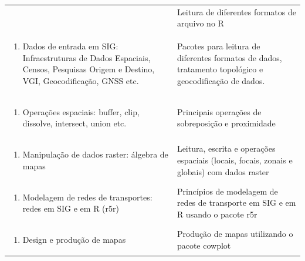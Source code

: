 \documentclass[
  letterpaper,
  DIV=11,
  numbers=noendperiod]{scrreprt}
\providecommand{\tightlist}{%
  \setlength{\itemsep}{0pt}\setlength{\parskip}{0pt}}
\begin{document}
\begin{longtable}[]{@{}
  >{\raggedright\arraybackslash}p{}
  >{\raggedright\arraybackslash}p{}@{}}
\begin{minipage}[t]{\linewidth}
\begin{enumerate}
\end{enumerate}
\end{minipage} & Leitura de diferentes formatos de arquivo no R \\
\begin{minipage}[t]{\linewidth}\raggedright
\begin{enumerate}
\def\labelenumi{\arabic{enumi}.}
\setcounter{enumi}{3}
\tightlist
\item
  Dados de entrada em SIG: Infraestruturas de Dados Espaciais, Censos,
  Pesquisas Origem e Destino, VGI, Geocodificação, GNSS etc.
\end{enumerate}
\end{minipage} & Pacotes para leitura de diferentes formatos de dados,
tratamento topológico e geocodificação de dados. \\
\begin{minipage}[t]{\linewidth}\raggedright
\begin{enumerate}
\def\labelenumi{\arabic{enumi}.}
\setcounter{enumi}{4}
\tightlist
\item
  Operações espaciais: buffer, clip, dissolve, intersect, union etc.
\end{enumerate}
\end{minipage} & Principais operações de sobreposição e proximidade \\
\begin{minipage}[t]{\linewidth}\raggedright
\begin{enumerate}
\def\labelenumi{\arabic{enumi}.}
\setcounter{enumi}{5}
\tightlist
\item
  Manipulação de dados raster: álgebra de mapas
\end{enumerate}
\end{minipage} & Leitura, escrita e operações espaciais (locais, focais,
zonais e globais) com dados raster \\
\begin{minipage}[t]{\linewidth}\raggedright
\begin{enumerate}
\def\labelenumi{\arabic{enumi}.}
\setcounter{enumi}{6}
\tightlist
\item
  Modelagem de redes de transportes: redes em SIG e em R (r5r)
\end{enumerate}
\end{minipage} & Princípios de modelagem de redes de transporte em SIG e
em R usando o pacote r5r \\
\begin{minipage}[t]{\linewidth}\raggedright
\begin{enumerate}
\def\labelenumi{\arabic{enumi}.}
\setcounter{enumi}{7}
\tightlist
\item
  Design e produção de mapas
\end{enumerate}
\end{minipage} & Produção de mapas utilizando o pacote cowplot \\
\end{longtable}
\end{document}
